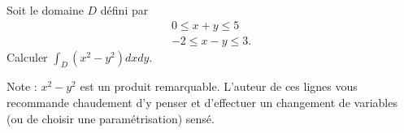
\begin{exercice}\label{exoOutilsMath-0142}

    Soit le domaine \( D\) défini par
    \begin{subequations}
        \begin{align}
            0\leq x+y\leq 5\\
            -2\leq x-y\leq 3.
        \end{align}
    \end{subequations}
    Calculer \( \int_D(x^2-y^2)dxdy\).

    Note : \( x^2-y^2\) est un produit remarquable. L'auteur de ces lignes vous recommande chaudement d'y penser et d'effectuer un changement de variables (ou de choisir une paramétrisation) sensé.
    

\end{exercice}

